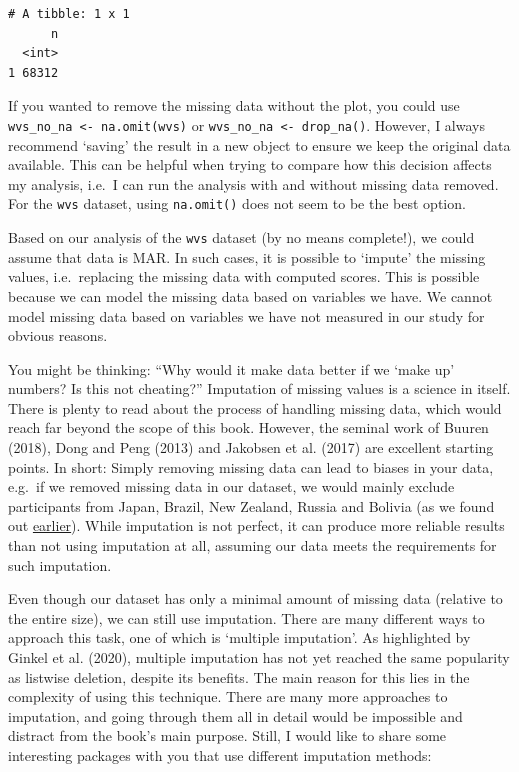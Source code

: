 \documentclass[
  letterpaper,
]{krantz}
\begin{document}
\begin{verbatim}
# A tibble: 1 x 1
      n
  <int>
1 68312
\end{verbatim}

If you wanted to remove the missing data without the plot, you could use
\texttt{wvs\_no\_na\ \textless{}-\ na.omit(wvs)} or
\texttt{wvs\_no\_na\ \textless{}-\ drop\_na()}. However, I always
recommend `saving' the result in a new object to ensure we keep the
original data available. This can be helpful when trying to compare how
this decision affects my analysis, i.e.~I can run the analysis with and
without missing data removed. For the \texttt{wvs} dataset, using
\texttt{na.omit()} does not seem to be the best option.

Based on our analysis of the \texttt{wvs} dataset (by no means
complete!), we could assume that data is MAR. In such cases, it is
possible to `impute' the missing values, i.e.~replacing the missing data
with computed scores. This is possible because we can model the missing
data based on variables we have. We cannot model missing data based on
variables we have not measured in our study for obvious reasons.

You might be thinking: ``Why would it make data better if we `make up'
numbers? Is this not cheating?'' Imputation of missing values is a
science in itself. There is plenty to read about the process of handling
missing data, which would reach far beyond the scope of this book.
However, the seminal work of Buuren (2018), Dong and Peng (2013) and
Jakobsen et al. (2017) are excellent starting points. In short: Simply
removing missing data can lead to biases in your data, e.g.~if we
removed missing data in our dataset, we would mainly exclude
participants from Japan, Brazil, New Zealand, Russia and Bolivia (as we
found out \hyperref[missing-data-by-country-table]{earlier}). While
imputation is not perfect, it can produce more reliable results than not
using imputation at all, assuming our data meets the requirements for
such imputation.

Even though our dataset has only a minimal amount of missing data
(relative to the entire size), we can still use imputation. There are
many different ways to approach this task, one of which is `multiple
imputation'. As highlighted by Ginkel et al. (2020), multiple imputation
has not yet reached the same popularity as listwise deletion, despite
its benefits. The main reason for this lies in the complexity of using
this technique. There are many more approaches to imputation, and going
through them all in detail would be impossible and distract from the
book's main purpose. Still, I would like to share some interesting
packages with you that use different imputation methods:
\end{document}
